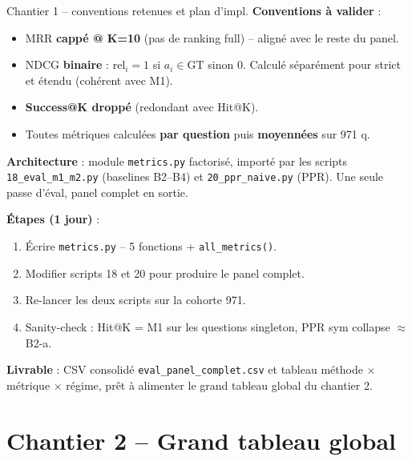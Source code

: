\documentclass[aspectratio=169,10pt]{beamer}
\newcommand{\okbox}[1]{%
  \begin{center}
  \colorbox{green!10}{\parbox{0.92\linewidth}{\centering #1}}
  \end{center}}
\begin{document}
\begin{frame}{Chantier 1 -- conventions retenues et plan d'impl.}
  \footnotesize
  \textbf{Conventions à valider} :
  \begin{itemize}\setlength{\itemsep}{0.1em}
    \item MRR \textbf{cappé @ K=10} (pas de ranking full) -- aligné avec le reste du panel.
    \item NDCG \textbf{binaire} : $\mathrm{rel}_i = 1$ si $a_i \in \mathrm{GT}$ sinon $0$.
    Calculé séparément pour strict et étendu (cohérent avec M1).
    \item \textbf{Success@K droppé} (redondant avec Hit@K).
    \item Toutes métriques calculées \textbf{par question} puis \textbf{moyennées} sur 971 q.
  \end{itemize}

  \vspace{0.5em}
  \textbf{Architecture} : module \texttt{metrics.py} factorisé, importé par les scripts
  \texttt{18\_eval\_m1\_m2.py} (baselines B2--B4) et \texttt{20\_ppr\_naive.py} (PPR).
  Une seule passe d'éval, panel complet en sortie.

  \vspace{0.5em}
  \textbf{Étapes (1 jour)} :
  \begin{enumerate}\setlength{\itemsep}{0.1em}
    \item Écrire \texttt{metrics.py} -- 5 fonctions + \texttt{all\_metrics()}.
    \item Modifier scripts 18 et 20 pour produire le panel complet.
    \item Re-lancer les deux scripts sur la cohorte 971.
    \item Sanity-check : Hit@K = M1 sur les questions singleton, PPR sym collapse $\approx$ B2-a.
  \end{enumerate}

  \vspace{0.4em}
  \okbox{\scriptsize \textbf{Livrable} : CSV consolidé \texttt{eval\_panel\_complet.csv} et tableau
  méthode $\times$ métrique $\times$ régime, prêt à alimenter le grand tableau global du chantier 2.}
\end{frame}

\section{Chantier 2 -- Grand tableau global}
\end{document}
